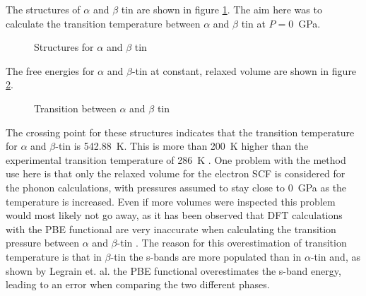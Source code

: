 \documentclass[12pt]{article}
\begin{document}
The structures of $\alpha$ and $\beta$ tin are shown in figure \ref{fig:alpha_and_beta_tin}. The aim here was to calculate the transition temperature between $\alpha$ and $\beta$ tin at $P=$\SI{0}{\giga\pascal}.
\begin{figure}
	\centering
	\qquad
	\qquad
	\caption{Structures for $\alpha$ and $\beta$ tin}
	\label{fig:alpha_and_beta_tin}
\end{figure}

The free energies for $\alpha$ and $\beta$-tin at constant, relaxed volume are shown in figure \ref{fig:sn_transition}.

\begin{figure}
	\centering
	
	\caption{Transition between $\alpha$ and $\beta$ tin}
	\label{fig:sn_transition}
\end{figure}

The crossing point for these structures indicates that the transition temperature for $\alpha$ and $\beta$-tin is \SI{542.88}{\kelvin}. This is more than \SI{200}{\kelvin} higher than the experimental transition temperature of \SI{286}{\kelvin} \cite{Raynor101}. 
One problem with the method use here is that only the relaxed volume for the electron SCF is considered for the phonon calculations, with pressures assumed to stay close to \SI{0}{\giga\pascal} as the temperature is increased.
Even if more volumes were inspected this problem would most likely not go away, as it has been observed that DFT calculations with the PBE functional are very inaccurate when calculating the transition pressure between $\alpha$ and $\beta$-tin \cite{legrain2016understanding}. The reason for this overestimation of transition temperature is that in $\beta$-tin the s-bands are more populated than in $\alpha$-tin and, as shown by Legrain et. al. the PBE functional overestimates the s-band energy, leading to an error when comparing the two different phases.
\end{document}
